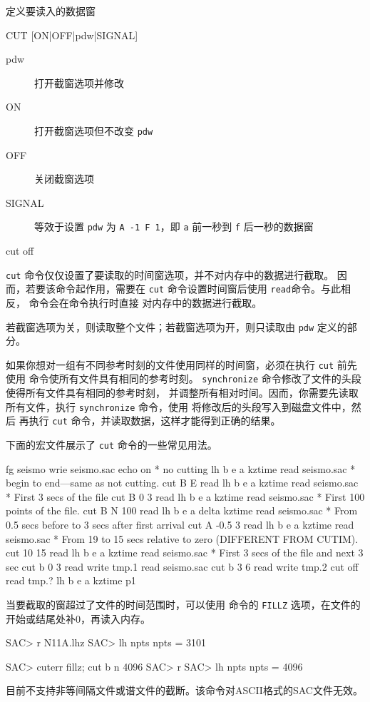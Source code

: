\label{cmd:cut}

定义要读入的数据窗

\begin{SACSTX}
CUT [ON|OFF|pdw|SIGNAL]
\end{SACSTX}

\begin{description}
\item [pdw] 打开截窗选项并修改 
\item [ON] 打开截窗选项但不改变 \texttt{pdw}
\item [OFF] 关闭截窗选项
\item [SIGNAL] 等效于设置 \texttt{pdw} 为 \texttt{A -1 F 1}，即 \texttt{a}
    前一秒到 \texttt{f} 后一秒的数据窗
\end{description}

\begin{SACDFT}
cut off
\end{SACDFT}

\texttt{cut} 命令仅仅设置了要读取的时间窗选项，并不对内存中的数据进行截取。
因而，若要该命令起作用，需要在 \texttt{cut} 命令设置时间窗后使用
\texttt{read}命令。与此相反， 命令会在命令执行时直接
对内存中的数据进行截取。

若截窗选项为关，则读取整个文件；若截窗选项为开，则只读取由 \texttt{pdw}
定义的部分。

如果你想对一组有不同参考时刻的文件使用同样的时间窗，必须在执行 \texttt{cut}
前先使用  命令使所有文件具有相同的参考时刻。
\texttt{synchronize} 命令修改了文件的头段使得所有文件具有相同的参考时刻，
并调整所有相对时间。因而，你需要先读取所有文件，执行 \texttt{synchronize}
命令，使用  将修改后的头段写入到磁盘文件中，然后
再执行 \texttt{cut} 命令，并读取数据，这样才能得到正确的结果。

下面的宏文件展示了 \texttt{cut} 命令的一些常见用法。
\begin{SACCode}
fg seismo
wrie seismo.sac
echo on
* no cutting
lh b e a kztime
read seismo.sac
* begin to end---same as not cutting.
cut B E
read
lh b e a kztime
read seismo.sac
* First 3 secs of the file
cut B 0 3
read
lh b e a kztime
read seismo.sac
* First 100 points of the file.
cut B N 100
read
lh b e a delta kztime
read seismo.sac
* From 0.5 secs before to 3 secs after first arrival
cut A -0.5 3
read
lh b e a kztime
read seismo.sac
* From 19 to 15 secs relative to zero (DIFFERENT FROM CUTIM).
cut 10 15
read
lh b e a kztime
read seismo.sac
* First 3 secs of the file and next 3 sec
cut b 0 3
read
write tmp.1
read seismo.sac
cut b 3 6
read
write tmp.2
cut off
read tmp.?
lh b e a kztime
p1
\end{SACCode}

当要截取的窗超过了文件的时间范围时，可以使用  命令的
\texttt{FILLZ} 选项，在文件的开始或结尾处补0，再读入内存。
\begin{SACCode}
SAC> r N11A.lhz
SAC> lh npts
    npts = 3101

SAC> cuterr fillz; cut b n 4096
SAC> r
SAC> lh npts
    npts = 4096
\end{SACCode}

目前不支持非等间隔文件或谱文件的截断。该命令对ASCII格式的SAC文件无效。
